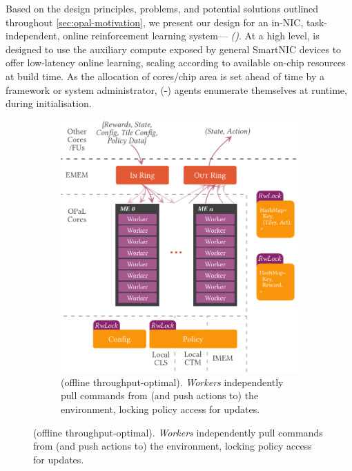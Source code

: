Based on the design principles, problems, and potential solutions outlined throughout \cref{sec:opal-motivation}, we present our design for an in-NIC, task-independent, online reinforcement learning system---\emph{\approachshort{} (\approach)}.
At a high level, \approachshort{} is designed to use the auxiliary compute exposed by general SmartNIC devices to offer low-latency online learning, scaling according to available on-chip resources at build time.
As the allocation of cores/chip area is set ahead of time by a framework or system administrator, \approachshort{}(-\Coopfw) agents enumerate themselves at runtime, during initialisation.

\begin{figure}
	\centering
	\begin{subfigure}{\linewidth}
		\centering
		\includegraphics[keepaspectratio, width=0.78\linewidth]{diagrams/opal/ind}
		\caption{\Indfw{} (offline throughput-optimal). \emph{Workers} independently pull commands from (and push actions to) the environment, locking policy access for updates.\label{fig:single-and-parallel:single}}
	\end{subfigure}


\end{figure}
